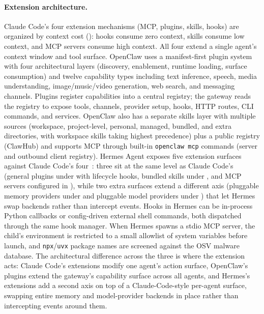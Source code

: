 \paragraph{Extension architecture.}
Claude Code's four extension mechanisms (MCP, plugins, skills, hooks) are organized by context cost (): hooks consume zero context, skills consume low context, and MCP servers consume high context. All four extend a single agent's context window and tool surface. OpenClaw uses a manifest-first plugin system with four architectural layers (discovery, enablement, runtime loading, surface consumption) and twelve capability types including text inference, speech, media understanding, image/music/video generation, web search, and messaging channels. Plugins register capabilities into a central registry; the gateway reads the registry to expose tools, channels, provider setup, hooks, HTTP routes, CLI commands, and services. OpenClaw also has a separate skills layer with multiple sources (workspace, project-level, personal, managed, bundled, and extra directories, with workspace skills taking highest precedence) plus a public registry (ClawHub) and supports MCP through built-in \texttt{openclaw mcp} commands (server and outbound client registry). Hermes Agent exposes five extension surfaces against Claude Code's four~\tierB{}: three sit at the same level as Claude Code's (general plugins under  with lifecycle hooks, bundled skills under , and MCP servers configured in ), while two extra surfaces extend a different axis (pluggable memory providers under  and pluggable model providers under ) that let Hermes swap backends rather than intercept events. Hooks in Hermes can be in-process Python callbacks or config-driven external shell commands, both dispatched through the same hook manager. When Hermes spawns a stdio MCP server, the child's environment is restricted to a small allowlist of system variables before launch, and \texttt{npx}/\texttt{uvx} package names are screened against the OSV malware database. The architectural difference across the three is where the extension acts: Claude Code's extensions modify one agent's action surface, OpenClaw's plugins extend the gateway's capability surface across all agents, and Hermes's extensions add a second axis on top of a Claude-Code-style per-agent surface, swapping entire memory and model-provider backends in place rather than intercepting events around them.

